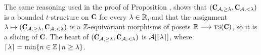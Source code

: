 \begin{remark}The same reasoning used in the proof of Proposition , shows that $(\C_{\A,\geq \lambda}, \C_{\A,<\lambda})$ is a bounded $t$-structure on $\C$ for every $\lambda\in \mathbb{R}$, and that the assignment $\lambda\mapsto (\C_{\A,\geq \lambda}, \C_{\A,<\lambda})$ is a $\mathbb{Z}$-equivariant morphisms of posets $\R\to \textsc{ts}(\C)$, so it is a slicing of $\C$. The heart of $(\C_{\A,\geq \lambda}, \C_{\A,<\lambda})$ is $\mathcal{A}[\left \lceil{\lambda}\right \rceil]$, where $\left \lceil{\lambda}\right \rceil=\min\{n\in \mathbb{Z}\,|\, n\geq\lambda\}$.
\end{remark}
